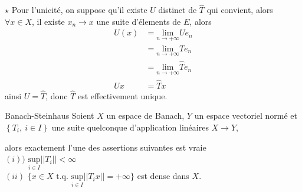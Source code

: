 \documentclass[a4paper,11pt, twoside]{article}
\begin{document}
\begin{Proof}
  $\star$ Pour l'unicité, on suppose qu'il existe $U$ distinct de $\hat T$ qui convient, alors $\forall x\in X$, il existe $x_n\longrightarrow x$ une suite d'élements  de $E$, alors
  \begin{align*}
    U(x)&=\underset{n\to+\infty}{\mathrm{lim}} Ue_n\\
    &=\underset{n\to+\infty}{\mathrm{lim}}Te_n\\
    &=\underset{n\to+\infty}{\mathrm{lim}}\hat Te_n\\
    Ux&=\hat Tx
  \end{align*}
  ainsi $U=\hat T$, donc $\hat T$ est effectivement unique.
\end{Proof}


\begin{thC}{Banach-Steinhaus}
  Soient $X$ un espace de Banach, $Y$ un espace vectoriel normé et $\left\{T_i,\ i\in I\right\}$ une suite quelconque d'application linéaires $X\longrightarrow Y$,
  
  alors exactement l'une des assertions suivantes est vraie\\
  
  $(i))$ $\underset{i\in I}{\mathrm{sup}}||T_i||<\infty$\\[1em]
  $(ii) $ $\big\{x\in X\text{ t.q. } \underset{i\in I}{\mathrm{sup}}||T_ix||=+\infty\big\}$ est dense dans $X$.
\end{thC}
\end{document}
